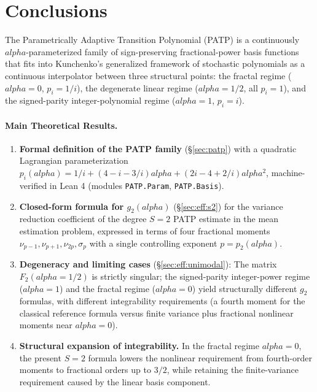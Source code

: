 \documentclass[11pt]{article}
\def\alpha{alpha}%
\def\mathbf#1{#1}%
\theoremstyle{definition}
\begin{document}
\section{Conclusions}\label{sec:conclusion}

The Parametrically Adaptive Transition Polynomial (PATP) is a continuously
$\alpha$-parameterized family of sign-preserving fractional-power basis
functions that fits into Kunchenko's generalized framework of stochastic
polynomials as a continuous interpolator between three structural points: the
fractal regime ($\alpha = 0$, $p_i = 1/i$), the degenerate linear regime
($\alpha = 1/2$, all $p_i = 1$), and the signed-parity integer-polynomial
regime ($\alpha = 1$, $p_i = i$).

\paragraph{Main Theoretical Results.}
\begin{enumerate}
  \item \textbf{Formal definition of the PATP family} (\S\ref{sec:patp})
        with a quadratic Lagrangian parameterization
        $p_i(\alpha) = 1/i + (4 - i - 3/i)\alpha + (2i - 4 + 2/i)\alpha^2$,
        machine-verified in Lean 4 (modules \texttt{PATP.Param},
        \texttt{PATP.Basis}).

  \item \textbf{Closed-form formula for $g_2(\alpha)$} (\S\ref{sec:eff:s2})
        for the variance reduction coefficient of the degree $S=2$ PATP
        estimate in the mean estimation problem, expressed in terms of
        four fractional moments $\nu_{p-1}, \nu_{p+1}, \nu_{2p}, \sigma_p$
        with a single controlling exponent $p = p_2(\alpha)$.

  \item \textbf{Degeneracy and limiting cases} (\S\ref{sec:eff:unimodal}):
        The matrix $\mathbf{F}_2(\alpha = 1/2)$ is strictly singular;
        the signed-parity integer-power regime ($\alpha = 1$) and the
        fractal regime ($\alpha = 0$) yield structurally different
        $g_2$ formulas, with different integrability requirements
        (a fourth moment for the classical reference formula versus finite
        variance plus fractional nonlinear moments near $\alpha=0$).

  \item \textbf{Structural expansion of integrability.} In the fractal
        regime $\alpha = 0$, the present $S=2$ formula lowers the nonlinear
        requirement from fourth-order moments to fractional orders up to
        $3/2$, while retaining the finite-variance requirement caused by
        the linear basis component.
\end{enumerate}
\end{document}
